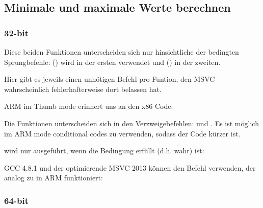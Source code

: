\subsection{Minimale und maximale Werte berechnen}

\subsubsection{32-bit}





Diese beiden Funktionen unterscheiden sich nur hinsichtliche der bedingten Sprungbefehle:
 () wird in der ersten verwendet
und  () in der zweiten.

\myindex{\CompilerAnomaly}
\label{MSVC_double_JMP_anomaly}
Hier gibt es jeweils einen unnötigen \JMP Befehl pro Funtion, den MSVC wahrscheinlich fehlerhafterweise dort belassen
hat.


ARM im Thumb mode erinnert uns an den x86 Code:



Die Funktionen unterscheiden sich in den Verzweigebefehlen:  und .
Es ist möglich im ARM mode conditional codes zu verwenden, sodass der Code kürzer ist.

 wird nur ausgeführt, wenn die Bedingung erfüllt (d.h. wahr) ist:



\Optimizing GCC 4.8.1 und der optimierende MSVC 2013 können den  Befehl verwenden, der analog zu
 in ARM funktioniert:



\subsubsection{64-bit}

